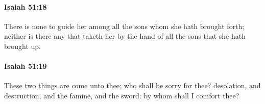 		\paragraph{Isaiah 51:18} %
			\label{ISAIAH-51-18}

			There is none to guide her among all the sons whom she hath brought forth; neither is there any that taketh her by the hand of all the sons that she hath brought up.


		\paragraph{Isaiah 51:19} %
			\label{ISAIAH-51-19}

			These two things are come unto thee; who shall be sorry for thee? desolation, and destruction, and the famine, and the sword: by whom shall I comfort thee?



